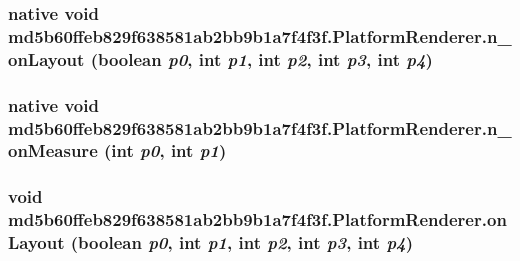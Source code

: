 \hypertarget{classmd5b60ffeb829f638581ab2bb9b1a7f4f3f_1_1_platform_renderer_e7e16c9b10a5745eb0b67775d46a9f2b}{
\subsubsection[{n\_\-onLayout}]{\setlength{\rightskip}{0pt plus 5cm}native void md5b60ffeb829f638581ab2bb9b1a7f4f3f.PlatformRenderer.n\_\-onLayout (boolean {\em p0}, \/  int {\em p1}, \/  int {\em p2}, \/  int {\em p3}, \/  int {\em p4})}}
\label{classmd5b60ffeb829f638581ab2bb9b1a7f4f3f_1_1_platform_renderer_e7e16c9b10a5745eb0b67775d46a9f2b}


\hypertarget{classmd5b60ffeb829f638581ab2bb9b1a7f4f3f_1_1_platform_renderer_05c8d5168fd42d9017bd758865451741}{
\subsubsection[{n\_\-onMeasure}]{\setlength{\rightskip}{0pt plus 5cm}native void md5b60ffeb829f638581ab2bb9b1a7f4f3f.PlatformRenderer.n\_\-onMeasure (int {\em p0}, \/  int {\em p1})}}
\label{classmd5b60ffeb829f638581ab2bb9b1a7f4f3f_1_1_platform_renderer_05c8d5168fd42d9017bd758865451741}


\hypertarget{classmd5b60ffeb829f638581ab2bb9b1a7f4f3f_1_1_platform_renderer_a62ffd461aef9e033818b416eacdac3d}{
\subsubsection[{onLayout}]{\setlength{\rightskip}{0pt plus 5cm}void md5b60ffeb829f638581ab2bb9b1a7f4f3f.PlatformRenderer.onLayout (boolean {\em p0}, \/  int {\em p1}, \/  int {\em p2}, \/  int {\em p3}, \/  int {\em p4})}}
\label{classmd5b60ffeb829f638581ab2bb9b1a7f4f3f_1_1_platform_renderer_a62ffd461aef9e033818b416eacdac3d}


